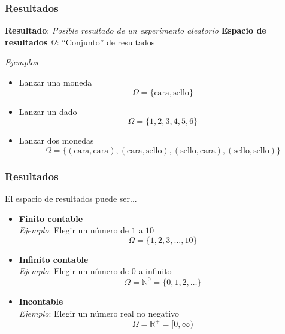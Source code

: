 \documentclass[xcolor=dvipsnames,10pt]{beamer}
\begin{document}
\begin{frame}
  \frametitle{Resultados}
  \begin{tcolorbox}
    \textbf{Resultado}: \emph{Posible resultado de un experimento aleatorio}
    \tcblower
    \textbf{Espacio de resultados} $\Omega$: ``Conjunto'' de resultados
  \end{tcolorbox}
  \emph{Ejemplos}
  \begin{itemize}
  \item Lanzar una moneda\\
    \begin{equation*}
      \Omega = \{\text{cara}, \text{sello} \}
    \end{equation*}
  \item Lanzar un dado\\
    \begin{equation*}
      \Omega = \{1, 2, 3, 4, 5, 6 \}
    \end{equation*}
  \item Lanzar dos monedas\\
    \begin{equation*}
      \Omega = \{(\text{cara}, \text{cara}), (\text{cara}, \text{sello}), (\text{sello}, \text{cara}), (\text{sello}, \text{sello}) \}
    \end{equation*}
  \end{itemize}
\end{frame}
%
\begin{frame}
  \frametitle{Resultados}
  El espacio de resultados puede ser...
  \begin{itemize}
  \item \textbf{Finito contable}\\
    \emph{Ejemplo}: Elegir un número de $1$ a $10$
    \begin{equation*}
      \Omega = \{1, 2, 3, \dots, 10 \}
    \end{equation*}
  \item \textbf{Infinito contable}\\
    \emph{Ejemplo}: Elegir un número de $0$ a infinito
    \begin{equation*}
      \Omega = \mathbb{N}^0 = \{ 0, 1, 2, \dots\}
    \end{equation*}
  \item \textbf{Incontable}\\
    \emph{Ejemplo}: Elegir un número real no negativo
    \begin{equation*}
      \Omega = \mathbb{R}^+ = [0, \infty)
    \end{equation*}
  \end{itemize}
\end{frame}
\end{document}
